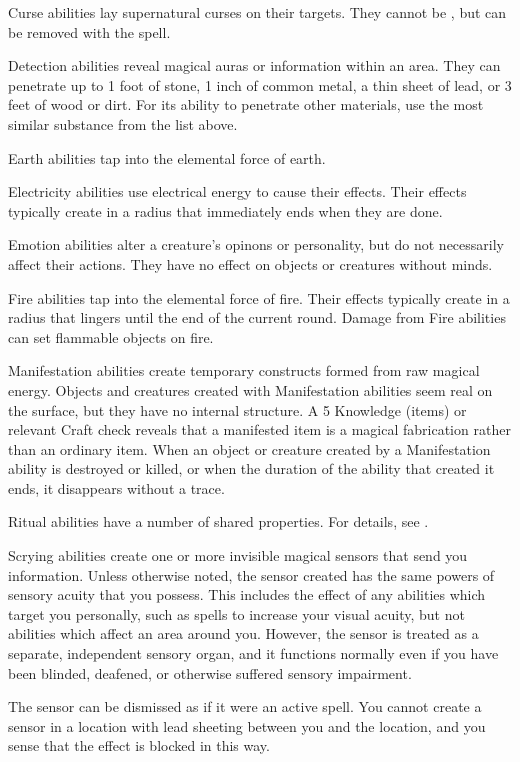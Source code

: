    Curse abilities lay supernatural curses on their targets.
  They cannot be , but can be removed with the  spell.

  \label{Detection} Detection abilities reveal magical auras or information within an area.
  They can penetrate up to 1 foot of stone, 1 inch of common metal, a thin sheet of lead, or 3 feet of wood or dirt.
  For its ability to penetrate other materials, use the most similar substance from the list above.

   Earth abilities tap into the elemental force of earth.

   Electricity abilities use electrical energy to cause their effects.
  Their effects typically create  in a \smallarea radius that immediately ends when they are done.

   Emotion abilities alter a creature's opinons or personality, but do not necessarily affect their actions.
  They have no effect on objects or creatures without minds.

   Fire abilities tap into the elemental force of fire.
  Their effects typically create  in a \smallarea radius that lingers until the end of the current round.
  Damage from Fire abilities can set flammable objects on fire.

   Manifestation abilities create temporary constructs formed from raw magical energy.
  Objects and creatures created with Manifestation abilities seem real on the surface, but they have no internal structure.
  A  5 Knowledge (items) or relevant Craft check reveals that a manifested item is a magical fabrication rather than an ordinary item.
  When an object or creature created by a Manifestation ability is destroyed or killed, or when the duration of the ability that created it ends, it disappears without a trace.

   Ritual abilities have a number of shared properties.
  For details, see .

   Scrying abilities create one or more invisible magical sensors that send you information.
  Unless otherwise noted, the sensor created has the same powers of sensory acuity that you possess.
  This includes the effect of any abilities which target you personally, such as spells to increase your visual acuity, but not abilities which affect an area around you.
  However, the sensor is treated as a separate, independent sensory organ, and it functions normally even if you have been blinded, deafened, or otherwise suffered sensory impairment.
  \par The sensor can be dismissed as if it were an active spell.
  You cannot create a sensor in a location with lead sheeting between you and the location, and you sense that the effect is blocked in this way.

